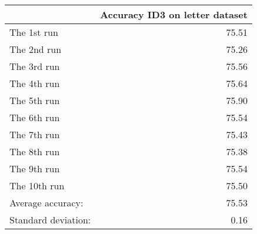 \begin{tabular}{lr}
\toprule
{} &  Accuracy ID3 on letter dataset \\
\midrule
The 1st run         &                           75.51 \\
The 2nd run         &                           75.26 \\
The 3rd run         &                           75.56 \\
The 4th run         &                           75.64 \\
The 5th run         &                           75.90 \\
The 6th run         &                           75.54 \\
The 7th run         &                           75.43 \\
The 8th run         &                           75.38 \\
The 9th run         &                           75.54 \\
The 10th run        &                           75.50 \\
Average accuracy:   &                           75.53 \\
Standard deviation: &                            0.16 \\
\bottomrule
\end{tabular}
